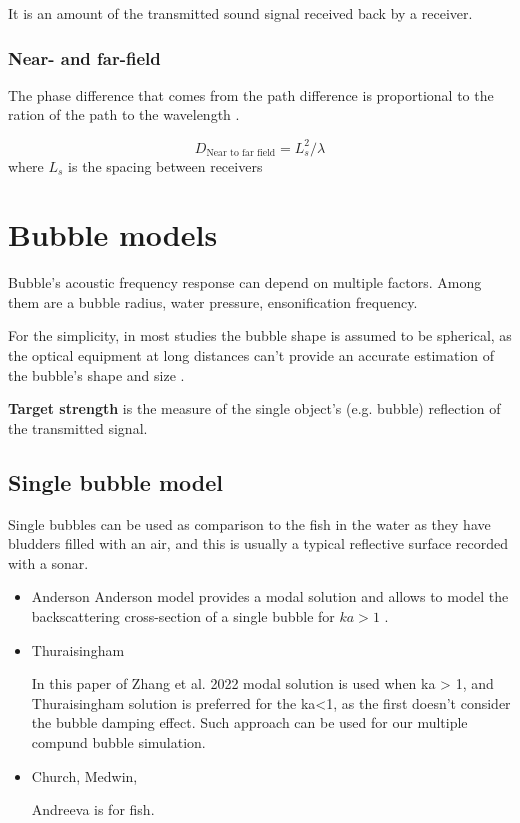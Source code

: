 It is an amount of the transmitted sound signal received back by a receiver.

\subsubsection{Near- and far-field}
The phase difference that comes from the path difference is proportional to the ration of the path to the wavelength \cite[p.30]{leighton_acoustic_2012}.

\[D_\text{Near to far field} = L_s^2/\lambda\] 
where $L_s$ is the spacing between receivers



\section{Bubble models}
Bubble's acoustic frequency response can depend on multiple factors. Among them are a bubble radius, water pressure, ensonification frequency.

For the simplicity, in most studies the bubble shape is assumed to be spherical, as the optical equipment at long distances can't provide an accurate estimation of the bubble's shape and size \cite[p.2]{zhang_efficient_2022}. 


\textbf{Target strength} is the measure of the single object's (e.g. bubble) reflection of the transmitted signal. %
\subsection{Single bubble model}

Single bubbles can be used as comparison to the fish in the water as they have bludders filled with an air, and this is usually a typical reflective surface recorded with a sonar.

\begin{itemize}
    \item Anderson
    Anderson model provides a modal solution and allows to model the backscattering cross-section of a single bubble for $ka > 1$ \cite{anderson_sound_2005}.

    \item Thuraisingham

    In this paper of Zhang et al. 2022 \cite{zhang_efficient_2022} modal solution is used when ka > 1, and Thuraisingham solution is preferred for the ka<1, as the first doesn't consider the bubble damping effect.  Such approach can be used for our multiple compund bubble simulation.

    \item Church, Medwin,

    Andreeva is for fish.

\end{itemize}

